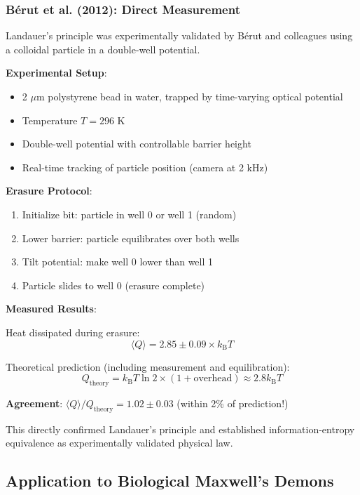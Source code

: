 \documentclass[11pt,a4paper]{article}
\newcommand{\kB}{k_\text{B}}
\begin{document}
\subsubsection{Bérut et al. (2012): Direct Measurement}

Landauer's principle was experimentally validated by Bérut and colleagues using a colloidal particle in a double-well potential\cite{berut2012experimental}.

\textbf{Experimental Setup}:
\begin{itemize}
\item 2 $\mu$m polystyrene bead in water, trapped by time-varying optical potential
\item Temperature $T = 296$ K
\item Double-well potential with controllable barrier height
\item Real-time tracking of particle position (camera at 2 kHz)
\end{itemize}

\textbf{Erasure Protocol}:
\begin{enumerate}
\item Initialize bit: particle in well 0 or well 1 (random)
\item Lower barrier: particle equilibrates over both wells
\item Tilt potential: make well 0 lower than well 1
\item Particle slides to well 0 (erasure complete)
\end{enumerate}

\textbf{Measured Results}:

Heat dissipated during erasure:
\begin{equation}
\langle Q \rangle = 2.85 \pm 0.09 \times \kB T
\end{equation}

Theoretical prediction (including measurement and equilibration):
\begin{equation}
Q_{\text{theory}} = \kB T \ln 2 \times (1 + \text{overhead}) \approx 2.8 \kB T
\end{equation}

\textbf{Agreement}: $\langle Q \rangle / Q_{\text{theory}} = 1.02 \pm 0.03$ (within 2\% of prediction!)

This directly confirmed Landauer's principle and established information-entropy equivalence as experimentally validated physical law.

\subsection{Application to Biological Maxwell's Demons}
\end{document}
